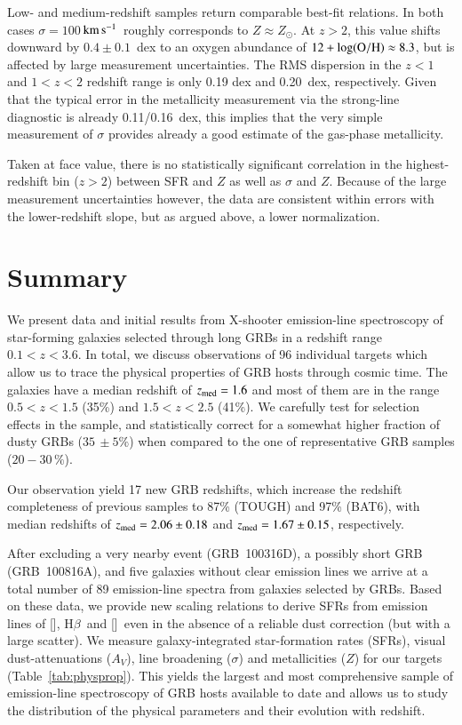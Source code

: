 \documentclass[traditabstract, longauth]{aa}
\newcommand{\kms}{$\rm{km\,s^{-1}}$}
\newcommand{\hb}{H$\beta$}
\newcommand{\oh}{12+\log(\rm{O/H})}
\newcommand{\oii}{[\ion{O}{ii}]}
\newcommand{\oiii}{[\ion{O}{iii}]}
\begin{document}
Low- and medium-redshift samples return comparable best-fit relations. In both cases $\sigma=100$\,\kms\, roughly corresponds to $Z\approx Z_{\odot}$. At $z > 2$, this value shifts downward by $0.4\pm0.1$~dex to an oxygen abundance of $\oh \approx 8.3$, but is affected by large measurement uncertainties.  {The RMS dispersion in the $z<1$ and $1<z<2$ redshift range is only 0.19 dex and 0.20~dex, respectively. Given that the typical error in the metallicity measurement via the strong-line diagnostic is already 0.11/0.16~dex, this implies that the very simple measurement of $\sigma$ provides already a good estimate of the gas-phase metallicity.}

Taken at face value, there is no statistically significant correlation in the highest-redshift bin ($z>2$) between SFR and $Z$ as well as $\sigma$ and $Z$. Because of the large measurement uncertainties however, the data are consistent within errors with the lower-redshift slope, but as argued above, a lower normalization.

\section{Summary} 
\label{sec:conc}

We present data and initial results from X-shooter emission-line spectroscopy of star-forming galaxies selected through long GRBs in a redshift range $0.1<z<3.6$. In total, we discuss observations of 96 individual targets which allow us to trace the physical properties of GRB hosts through cosmic time. The galaxies have a median redshift of $z_{\rm med}=1.6$ and most of them are in the range $0.5 < z < 1.5$ (35\%) and $1.5 < z < 2.5$ (41\%). We carefully test for selection effects in the sample, and statistically correct for a somewhat higher fraction of dusty GRBs ($35\,\pm5\%$) when compared to the one of representative GRB samples ($20-30\,\%$). 

Our observation yield 17 new GRB redshifts, which increase the redshift completeness of previous samples to 87\% (TOUGH) and 97\% (BAT6), with median redshifts of $z_{\rm{med}} = 2.06\pm0.18$ and $z_{\rm{med}} = 1.67\pm0.15$, respectively.

After excluding a very nearby event (GRB~100316D), a possibly short GRB (GRB~100816A), and five galaxies without clear emission lines we arrive at a total number of 89 emission-line spectra from galaxies selected by GRBs. Based on these data, we provide new scaling relations to derive SFRs from emission lines of \oii, \hb\, and \oiii\, even in the absence of a reliable dust correction (but with a large scatter). We measure galaxy-integrated star-formation rates (SFRs), visual dust-attenuations ($A_V$), line broadening ($\sigma$) and metallicities ($Z$) for our targets (Table~\ref{tab:physprop}). This yields the largest and most comprehensive sample of emission-line spectroscopy of GRB hosts available to date and allows us to study the distribution of the physical parameters and their evolution with redshift. 
\end{document}
